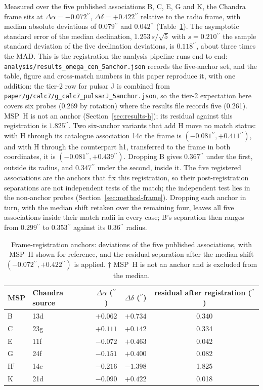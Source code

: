 \documentclass[11pt]{article}
\newcommand{\as}{\ensuremath{^{\prime\prime}}}
\begin{document}
Measured over the five published associations B, C, E, G and K, the Chandra frame sits at $\Delta\alpha = -0.072\as$, $\Delta\delta = +0.422\as$ relative to the radio frame, with median absolute deviations of $0.079\as$ and $0.042\as$ (Table~\ref{tab:anchors}). The asymptotic standard error of the median declination, $1.253\,s/\sqrt{5}$ with $s=0.210\as$ the sample standard deviation of the five declination deviations, is $0.118\as$, about three times the MAD. This is the registration the analysis pipeline runs end to end: \texttt{analysis/results\_omega\_cen\_5anchor.json} records the five-anchor set, and the table, figure and cross-match numbers in this paper reproduce it, with one addition: the tier-2 row for pulsar J is combined from \texttt{paper/g/calc7/g\_calc7\_pulsarJ\_5anchor.json}, so the tier-2 expectation here covers six probes (0.269 by rotation) where the results file records five (0.261). MSP~H is not an anchor (Section~\ref{sec:results-h}); its residual against this registration is $1.825\as$. Two six-anchor variants that add H move no match status: with H through its catalogue association 14c the frame is $(-0.081\as, +0.411\as)$, and with H through the \citet{ZhaoHeinke2023} counterpart h1, transferred to the \citet{Henleywillis2018} frame in both coordinates, it is $(-0.081\as, +0.439\as)$. Dropping B gives $0.367\as$ under the first, outside its radius, and $0.347\as$ under the second, inside it. The five registered associations are the anchors that fix this registration, so their post-registration separations are not independent tests of the match; the independent test lies in the non-anchor probes (Section~\ref{sec:method-frame}). Dropping each anchor in turn, with the median shift retaken over the remaining four, leaves all five associations inside their match radii in every case; B's separation then ranges from $0.299\as$ to $0.353\as$ against its $0.36\as$ radius.

\begin{table}[tbp]
\centering
\small
\caption{Frame-registration anchors: deviations of the five published associations, with MSP~H shown for reference, and the residual separation after the median shift $(-0.072\as, +0.422\as)$ is applied. $\dagger$ MSP~H is not an anchor and is excluded from the median.}
\label{tab:anchors}
\begin{tabular}{llccc}
\toprule
MSP & Chandra source & $\Delta\alpha$ (\as) & $\Delta\delta$ (\as) & residual after registration (\as) \\
\midrule
B & 13d & $+0.062$ & $+0.734$ & 0.340 \\
C & 23g & $+0.111$ & $+0.142$ & 0.334 \\
E & 11f & $-0.072$ & $+0.463$ & 0.042 \\
G & 24f & $-0.151$ & $+0.400$ & 0.082 \\
H$^{\dagger}$ & 14c & $-0.216$ & $-1.398$ & 1.825 \\
K & 21d & $-0.090$ & $+0.422$ & 0.018 \\
\bottomrule
\end{tabular}
\end{table}
\end{document}
